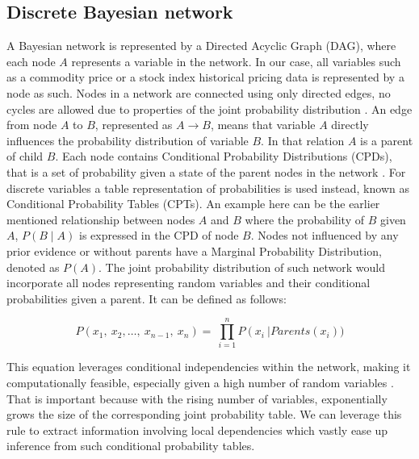 \documentclass[12pt, letterpaper]{article}
\begin{document}
\subsection{Discrete Bayesian network}

A Bayesian network is represented by a Directed Acyclic Graph (DAG), where each node $A$ represents a variable in the network. In our case, all variables such as a commodity price or a stock index historical pricing data is represented by a node as such. Nodes in a network are connected using only directed edges, no cycles are allowed due to properties of the joint probability distribution \parencite{bengal2008}. An edge from node $A$ to $B$, represented as $A\rightarrow B$, means that variable $A$ directly influences the probability distribution of variable $B$. In that relation $A$ is a parent of child $B$. Each node contains Conditional Probability Distributions (CPDs), that is a set of probability given a state of the parent nodes in the network \parencite{pearl2014}. For discrete variables a table representation of probabilities is used instead, known as Conditional Probability Tables (CPTs).  An example here can be the earlier mentioned relationship between nodes $A$ and $B$ where the probability of $B$ given $A$, $P(B \mid A)$ is expressed in the CPD of node $B$. Nodes not influenced by any prior evidence or without parents have a Marginal Probability Distribution, denoted as $P(A)$. The joint probability distribution of such network would incorporate all nodes representing random variables and their conditional probabilities given a parent. It can be defined as follows:

\begin{equation}
P\left(x_1,\ x_2,\ldots,\ x_{n-1},\ x_n\right)=\ \prod_{i=1}^{n}{P\left(x_i\ \right|Parents(x_i))}
\end{equation}

This equation leverages conditional independencies within the network, making it computationally feasible, especially given a high number of random variables \parencite{bengal2008}. That is important because with the rising number of variables, exponentially grows the size of the corresponding joint probability table. We can leverage this rule to extract information involving local dependencies which vastly ease up inference from such conditional probability tables.
\end{document}
